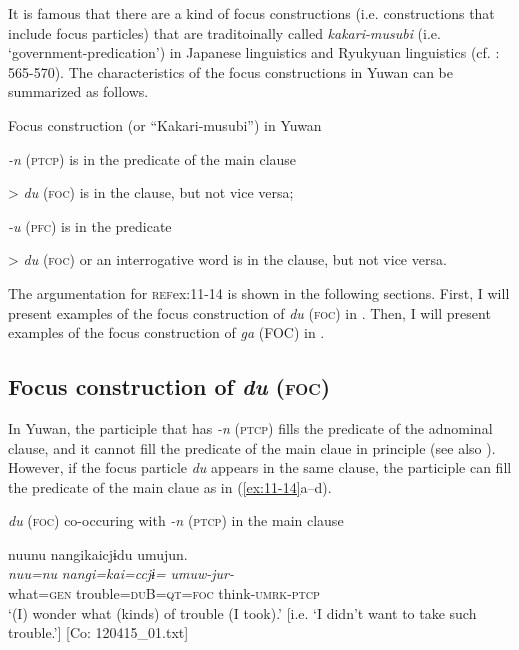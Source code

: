 It is famous that there are a kind of focus constructions (i.e. constructions that include focus particles) that are traditoinally called \textit{kakari-musubi} (i.e. ‘government-predication’) in Japanese linguistics and Ryukyuan linguistics (cf. \citealt{Shimoji2008}: 565-570). The characteristics of the focus constructions in Yuwan can be summarized as follows.

\ea\label{ex:11-14}   Focus construction (or “Kakari-musubi”) in Yuwan

\ea   \textit{{}-n} (\textsc{ptcp}) is in the predicate of the main clause

> \textit{du} (\textsc{foc}) is in the clause, but not vice versa;

\ex   \textit{{}-u} (\textsc{pfc}) is in the predicate

> \textit{du} (\textsc{foc}) or an interrogative word is in the clause, but not vice versa.
\z
\z

The argumentation for \textsc{ref}{ex:11-14} is shown in the following sections. First, I will present examples of the focus construction of \textit{du} (\textsc{foc}) in . Then, I will present examples of the focus construction of \textit{ga} (FOC) in .

\subsection{Focus construction of \textit{du} (\textsc{foc})}\label{sec:11.3.1}

In Yuwan, the participle that has \textit{{}-n} (\textsc{ptcp}) fills the predicate of the adnominal clause, and it cannot fill the predicate of the main claue in principle (see also ). However, if the focus particle \textit{du} appears in the same clause, the participle can fill the predicate of the main claue as in (\ref{ex:11-14}a--d).

\ea\label{ex:11-15}  \textit{du} (\textsc{foc}) co-occuring with \textit{{}-n} (\textsc{ptcp}) in the main clause

  \ea\relax[= (6-108 a)]

    
      \glll    nuunu  nangikaicjɨdu  umujun.\\
      \textit{nuu=nu}  \textit{nangi=kai=ccjɨ=}  \textit{umuw-jur-}\\
      what=\textsc{gen}  trouble=\textsc{du}B=\textsc{qt}=\textsc{foc}  think-\textsc{umrk}-\textsc{ptcp}\\
\glt       ‘(I) wonder what (kinds) of trouble (I took).’ [i.e. ‘I didn’t want to take such trouble.’] [Co: 120415\_01.txt]

